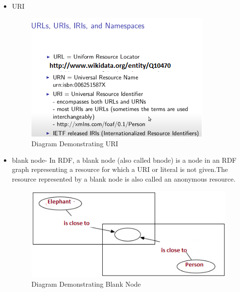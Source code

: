 \documentclass[12pt]{article}
\begin{document}
\begin{itemize}
\item URI

\begin{figure}[!h]
\center
\includegraphics{uriModifiednew.png}
\caption{Diagram Demonstrating URI}
\end{figure}

\item blank node- In RDF, a blank node (also called bnode) is a node in an RDF graph representing a resource for which a URI or literal is not given.The resource represented by a blank node is also called an anonymous resource. \\
\begin{figure}[!h]
\center
\includegraphics{images/blankNodem.png}

\caption{Diagram Demonstrating Blank Node}
\end{figure}
\end{itemize}
\newpage
\end{document}
